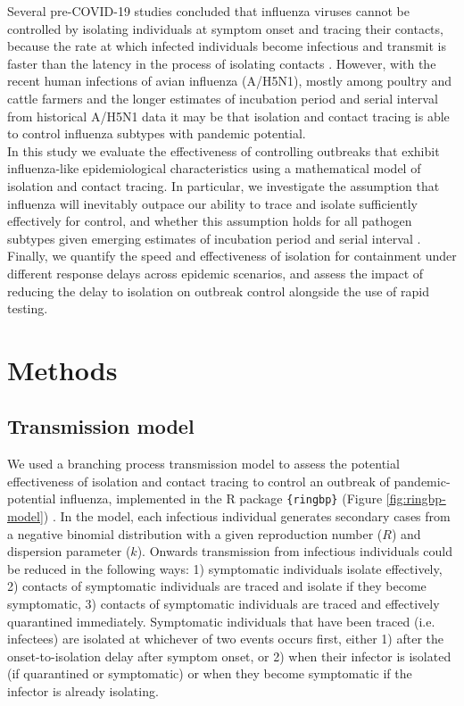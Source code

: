 \documentclass{article}
\begin{document}
Several pre-COVID-19 studies concluded that influenza viruses cannot be controlled by isolating individuals at symptom onset and tracing their contacts, because the rate at which infected individuals become infectious and transmit is faster than the latency in the process of isolating contacts \citep{fraserFactorsThatMake2004, klinkenbergEffectivenessContactTracing2006}. However, with the recent human infections of avian influenza (A/H5N1), mostly among poultry and cattle farmers \citep{gargHighlyPathogenicAvian2025} and the longer estimates of incubation period and serial interval from historical A/H5N1 data \citep{Ward2024.12.11.24318702} it may be that isolation and contact tracing is able to control influenza subtypes with pandemic potential. \\

In this study we evaluate the effectiveness of controlling outbreaks that exhibit influenza-like epidemiological characteristics using a mathematical model of isolation and contact tracing. In particular, we investigate the assumption that influenza will inevitably outpace our ability to trace and isolate sufficiently effectively for control, and whether this assumption holds for all pathogen subtypes given emerging estimates of incubation period and serial interval \citep{Ward2024.12.11.24318702}. Finally, we quantify the speed and effectiveness of isolation for containment under different response delays across epidemic scenarios, and assess the impact of reducing the delay to isolation on outbreak control alongside the use of rapid testing.

\section*{Methods}

\subsection*{Transmission model}

We used a branching process transmission model to assess the potential effectiveness of isolation and contact tracing to control an outbreak of pandemic-potential influenza, implemented in the R package \texttt{\{ringbp\}} (Figure \ref{fig:ringbp-model}) \citep{hellewellRingbpSimulateEvaluate2025}. In the model, each infectious individual generates secondary cases from a negative binomial distribution with a given reproduction number ($R$) and dispersion parameter ($k$). Onwards transmission from infectious individuals could be reduced in the following ways: 1) symptomatic individuals isolate effectively, 2) contacts of symptomatic individuals are traced and isolate if they become symptomatic, 3) contacts of symptomatic individuals are traced and effectively quarantined immediately. Symptomatic individuals that have been traced (i.e. infectees) are isolated at whichever of two events occurs first, either 1) after the onset-to-isolation delay after symptom onset, or 2) when their infector is isolated (if quarantined or symptomatic) or when they become symptomatic if the infector is already isolating. \\
\end{document}
